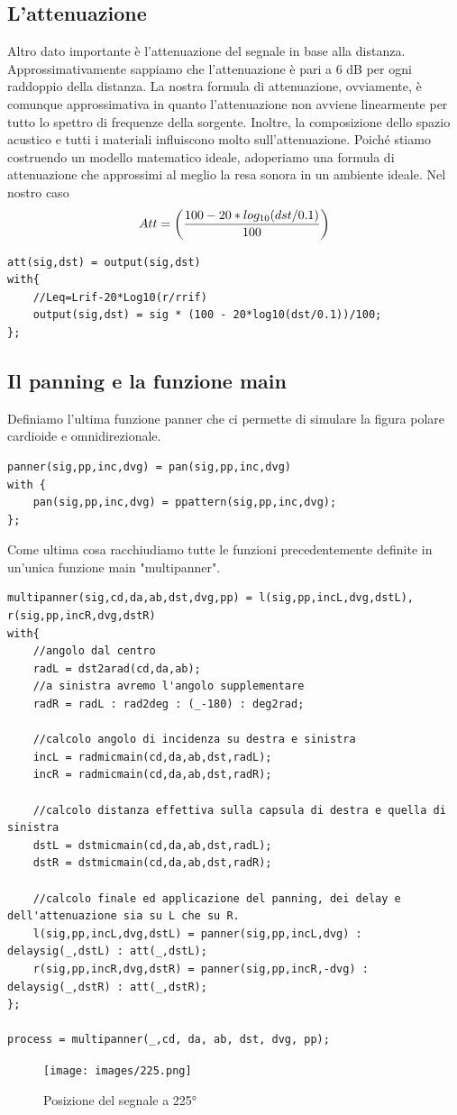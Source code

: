\documentclass{article}
\begin{document}
\subsection{L'attenuazione}
    Altro dato importante è l'attenuazione del segnale in base alla distanza. Approssimativamente sappiamo che l'attenuazione è pari a 6 dB per ogni raddoppio della distanza. La nostra formula di attenuazione, ovviamente, è comunque approssimativa in quanto l'attenuazione non avviene linearmente per tutto lo spettro di frequenze della sorgente. Inoltre, la composizione dello spazio acustico e tutti i materiali influiscono molto sull'attenuazione. Poiché stiamo costruendo un modello matematico ideale, adoperiamo una formula di attenuazione che approssimi al meglio la resa sonora in un ambiente ideale. Nel nostro caso\\
    $$Att = \biggl({100 - 20*log_{10}(dst/0.1)\over100} \biggr)$$
\begin{lstlisting}
att(sig,dst) = output(sig,dst)
with{
    //Leq=Lrif-20*Log10(r/rrif)
    output(sig,dst) = sig * (100 - 20*log10(dst/0.1))/100;
};
\end{lstlisting}

\subsection{Il panning e la funzione main}
Definiamo l'ultima funzione panner che ci permette di simulare la figura polare cardioide e omnidirezionale. 
\begin{lstlisting}
panner(sig,pp,inc,dvg) = pan(sig,pp,inc,dvg)
with {
    pan(sig,pp,inc,dvg) = ppattern(sig,pp,inc,dvg); 
};
\end{lstlisting}

Come ultima cosa racchiudiamo tutte le funzioni precedentemente definite in un'unica funzione main "multipanner".

\begin{lstlisting}
multipanner(sig,cd,da,ab,dst,dvg,pp) = l(sig,pp,incL,dvg,dstL), r(sig,pp,incR,dvg,dstR)
with{
    //angolo dal centro
    radL = dst2arad(cd,da,ab);
    //a sinistra avremo l'angolo supplementare
    radR = radL : rad2deg : (_-180) : deg2rad;

    //calcolo angolo di incidenza su destra e sinistra
    incL = radmicmain(cd,da,ab,dst,radL);
    incR = radmicmain(cd,da,ab,dst,radR);

    //calcolo distanza effettiva sulla capsula di destra e quella di sinistra
    dstL = dstmicmain(cd,da,ab,dst,radL);
    dstR = dstmicmain(cd,da,ab,dst,radR);

    //calcolo finale ed applicazione del panning, dei delay e dell'attenuazione sia su L che su R.
    l(sig,pp,incL,dvg,dstL) = panner(sig,pp,incL,dvg) : delaysig(_,dstL) : att(_,dstL);
    r(sig,pp,incR,dvg,dstR) = panner(sig,pp,incR,-dvg) : delaysig(_,dstR) : att(_,dstR);
};

process = multipanner(_,cd, da, ab, dst, dvg, pp);
\end{lstlisting}
    \begin{figure}[H]
        \centering
        \texttt{[image: images/225.png]}
         \caption{\label{fig10}Posizione del segnale a 225°}
    \end{figure}
\end{document}
